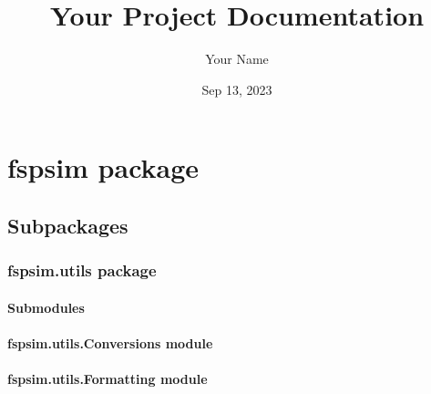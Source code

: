\documentclass[letterpaper,10pt,english]{sphinxmanual}
\title{Your Project Documentation}
\date{Sep 13, 2023}
\author{Your Name}
\begin{document}
\pagestyle{empty}
\sphinxmaketitle
\pagestyle{plain}
\sphinxtableofcontents
\pagestyle{normal}
\label{\detokenize{index::doc}}


\sphinxstepscope


\chapter{fspsim package}
\label{\detokenize{fspsim:fspsim-package}}\label{\detokenize{fspsim::doc}}

\section{Subpackages}
\label{\detokenize{fspsim:subpackages}}
\sphinxstepscope


\subsection{fspsim.utils package}
\label{\detokenize{fspsim.utils:fspsim-utils-package}}\label{\detokenize{fspsim.utils::doc}}

\subsubsection{Submodules}
\label{\detokenize{fspsim.utils:submodules}}

\subsubsection{fspsim.utils.Conversions module}
\label{\detokenize{fspsim.utils:fspsim-utils-conversions-module}}

\subsubsection{fspsim.utils.Formatting module}
\label{\detokenize{fspsim.utils:module-fspsim.utils.Formatting}}\label{\detokenize{fspsim.utils:fspsim-utils-formatting-module}}
\end{document}
